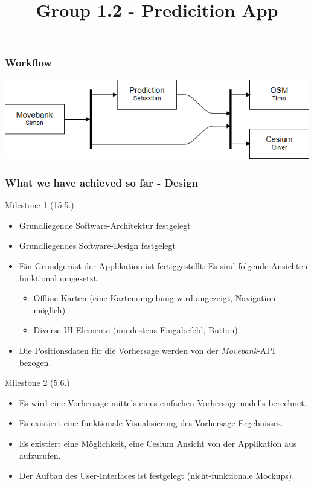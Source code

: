 \documentclass[xcolor=dvipsnames]{beamer}
\title[] {Group 1.2 - Predicition App}
\date{} %
\begin{document}
\frame{\titlepage}

\begin{frame}
	\frametitle{Workflow}
	\includegraphics[width=\textwidth]{Tasks.png}
\end{frame}

\begin{frame}
	\frametitle{What we have achieved so far - Design}
	\large{Milestone 1 (15.5.)}
	\normalsize
	\begin{itemize} 
		\item \color{Green}Grundliegende Software-Architektur festgelegt
		\item \color{Green}Grundliegendes Software-Design festgelegt
		\item \color{Green}Ein Grundgerüst der Applikation ist fertiggestellt: Es sind folgende Ansichten funktional umgesetzt:
		\begin{itemize} 
			\item \color{Green}Offline-Karten (eine Kartenumgebung wird angezeigt, Navigation möglich)
			\item \color{Green}Diverse UI-Elemente (mindestens Eingabefeld, Button)
		\end{itemize} 
		\item \color{LightGray}Die Positionsdaten für die Vorhersage werden von der \textit{Movebank}-API bezogen.
	\end{itemize}     
	\large{Milestone 2 (5.6.)}
	\normalsize
	\begin{itemize} 
		\item \color{LightGray}Es wird eine Vorhersage mittels eines einfachen Vorhersagemodells berechnet.
		\item \color{LightGray}Es existiert eine funktionale Visualisierung des Vorhersage-Ergebnisses.
		\item \color{LightGray}Es existiert eine Möglichkeit, eine Cesium Ansicht von der Applikation aus aufzurufen.
		\item \color{Green}Der Aufbau des User-Interfaces ist festgelegt (nicht-funktionale Mockups).
	\end{itemize}
\end{frame}
\end{document}

